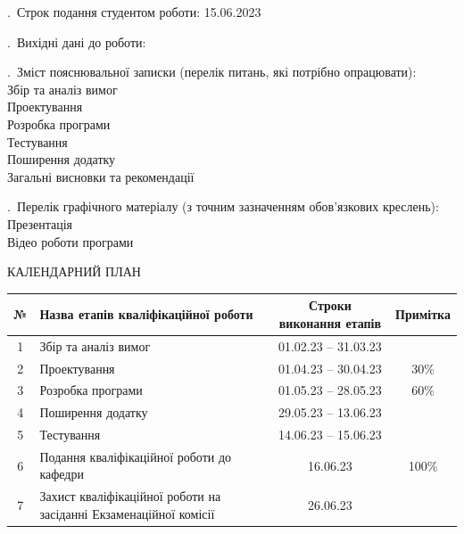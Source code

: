 \documentclass[14pt]{extarticle}
\begin{document}
\begin{spacing}{1.33}
. Строк подання студентом роботи: 15.06.2023

. Вихідні дані до роботи:

. Зміст пояснювальної записки (перелік питань, які потрібно опрацювати):\\
Збір та аналіз вимог\\
Проектування\\
Розробка програми\\
Тестування\\
Поширення додатку\\
Загальні висновки та рекомендації

. Перелік графічного матеріалу (з точним зазначенням обов’язкових креслень):\\
Презентація\\
Відео роботи програми\\
\end{spacing}

\newpage
\thispagestyle{empty}
\centerline{КАЛЕНДАРНИЙ ПЛАН}
\vspace{\baselineskip}

\noindent
\begin{tabularx}{\linewidth}{|c|X|c|c|}
  \hline
  № & Назва етапів кваліфікаційної роботи                               & Строки виконання етапів & Примітка\\
  \hline
  1 & Збір та аналіз вимог                                              & 01.02.23 -- 31.03.23                & \\
  \hline
  2 & Проектування                                                      & 01.04.23 -- 30.04.23 & 30\% \\
  \hline
  3 & Розробка програми                                                 & 01.05.23 -- 28.05.23 & 60\% \\
  \hline
  4 & Поширення додатку                                                 & 29.05.23 -- 13.06.23 & \\
  \hline
  5 & Тестування                                                        & 14.06.23 -- 15.06.23 & \\
  \hline
  6 & Подання кваліфікаційної роботи до кафедри                         & 16.06.23 & 100\% \\
  \hline
  7 & Захист кваліфікаційної роботи на засіданні Екзаменаційної комісії & 26.06.23 & \\
  \hline
\end{tabularx}
\end{document}

